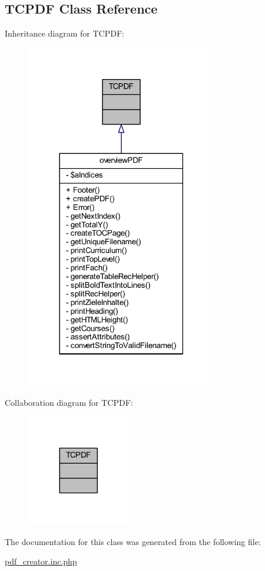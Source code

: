 \hypertarget{class_t_c_p_d_f}{\subsection{T\+C\+P\+D\+F Class Reference}
\label{class_t_c_p_d_f}
}


Inheritance diagram for T\+C\+P\+D\+F\+:
\nopagebreak
\begin{figure}[H]
\begin{center}
\leavevmode
\includegraphics[width=237pt]{class_t_c_p_d_f__inherit__graph}
\end{center}
\end{figure}


Collaboration diagram for T\+C\+P\+D\+F\+:
\nopagebreak
\begin{figure}[H]
\begin{center}
\leavevmode
\includegraphics[width=128pt]{class_t_c_p_d_f__coll__graph}
\end{center}
\end{figure}


The documentation for this class was generated from the following file\+:\begin{DoxyCompactItemize}
\item 
\hyperlink{pdf__creator_8inc_8php}{pdf\+\_\+creator.\+inc.\+php}\end{DoxyCompactItemize}
